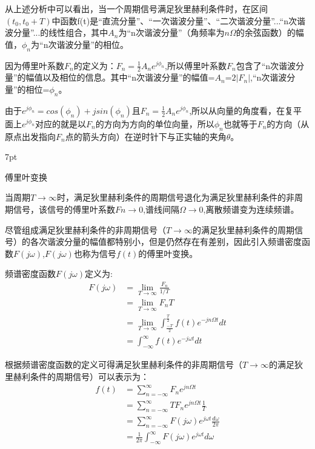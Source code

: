 \documentclass{article}
\numberwithin{equation}{section}
\numberwithin{figure}{section}
\newenvironment{formal}{%
\def\FrameCommand{%
\hspace{1pt}%
{\color{DarkBlue}\vrule width 2pt}%
{\color{formalshade}\vrule width 4pt}%
\colorbox{formalshade}%
}%
\MakeFramed{\advance\hsize-\width\FrameRestore}%
\noindent\hspace{-4.55pt}%
\begin{adjustwidth}{}{7pt}%
\vspace{2pt}\vspace{2pt}%
}
{%
\vspace{2pt}\end{adjustwidth}\endMakeFramed%
}
\begin{document}
从上述分析中可以看出，当一个周期信号满足狄里赫利条件时，在区间$(t_0,t_0+T)$中函数f(t)是“直流分量”、“一次谐波分量”、“二次谐波分量”...“n次谐波分量”...的线性组合，其中$A_n$为“n次谐波分量”（角频率为$n\Omega$的余弦函数）的幅值，$\phi_n$为“n次谐波分量”的相位。

因为傅里叶系数$F_n$的定义为：$F_n=\frac{1}{2}A_ne^{j\phi_n}$,所以傅里叶系数$F_n$包含了“n次谐波分量”的幅值以及相位的信息。其中“n次谐波分量”的幅值=$A_n$=$2|F_n|$,“n次谐波分量”的相位=$\phi_n$。

由于$e^{j\phi_n}=cos(\phi_n)+jsin(\phi_n)$且$F_n=\frac{1}{2}A_ne^{j\phi_n}$,所以从向量的角度看，在复平面上$e^{j\phi_n}$对应的就是以$F_n$的方向为方向的单位向量，所以$\phi_n$也就等于$F_n$的方向（从原点出发指向$F_n$点的箭头方向）在逆时针下与正实轴的夹角$\theta $。

\begin{formal}
    傅里叶变换
\end{formal}

当周期$T\rightarrow \infty$时，满足狄里赫利条件的周期信号退化为满足狄里赫利条件的非周期信号，该信号的傅里叶系数$Fn\rightarrow 0$,谱线间隔$\Omega \rightarrow 0$,离散频谱变为连续频谱。

尽管组成满足狄里赫利条件的非周期信号（$T\rightarrow \infty$的满足狄里赫利条件的周期信号）的各次谐波分量的幅值都特别小，但是仍然存在有差别，因此引入频谱密度函数$F(j\omega)$,$F(j\omega)$也称为信号$f(t)$的傅里叶变换。

频谱密度函数$F(j\omega)$定义为:
\begin{equation}
    \begin{split}
        F(j\omega)&=\lim_{T \to \infty} \frac{F_n}{1/T}\\
        &=\lim_{T \to \infty} F_nT\\
        &=\lim_{T \to \infty}\int_{\frac{-T}{2}}^{\frac{T}{2}}f(t)e^{-jn\Omega t}dt\\
        &=\int_{-\infty}^{\infty}f(t)e^{-j\omega t}dt
    \end{split}
\end{equation}

根据频谱密度函数的定义可得满足狄里赫利条件的非周期信号（$T\rightarrow \infty$的满足狄里赫利条件的周期信号）可以表示为：
\begin{equation}
    \begin{split}
        f(t)&=\sum_{n=-\infty}^{\infty}F_ne^{jn\Omega t}\\
        &=\sum_{n=-\infty}^{\infty}TF_ne^{jn\Omega t}\frac{1}{T}\\
        &=\sum_{n=-\infty}^{\infty}F(j\omega)e^{j\omega t}\frac{d\omega}{2\pi}\\
        &=\frac{1}{2\pi}\int_{-\infty}^{\infty}F(j\omega)e^{j\omega t}d\omega
    \end{split}
\end{equation}
\end{document}
